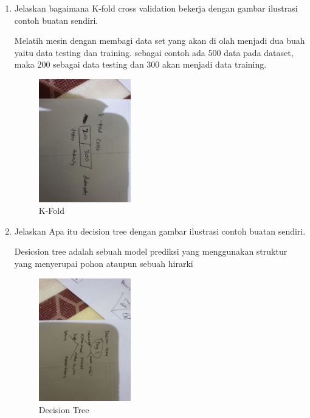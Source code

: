 \begin{enumerate}
            \item Jelaskan bagaimana K-fold cross validation bekerja dengan gambar ilustrasi contoh buatan sendiri.\par
            Melatih mesin dengan membagi data set yang akan di olah menjadi dua buah yaitu data testing dan training. sebagai contoh ada 500 data pada dataset, maka 200 sebagai data testing dan 300 akan menjadi data training.
            \begin{figure}[H]
                \includegraphics[width=4cm]{figures/1174040/chapter2/k.jpeg}
                \centering
                \caption{K-Fold}
            \end{figure}

            \item Jelaskan Apa itu decision tree dengan gambar ilustrasi contoh buatan sendiri.\par
            Desicsion tree adalah sebuah model prediksi yang menggunakan struktur yang menyerupai pohon ataupun sebuah hirarki
            \begin{figure}[H]
                \includegraphics[width=4cm]{figures/1174040/chapter2/tree.jpeg}
                \centering
                \caption{Decision Tree}
            \end{figure}


\end{enumerate}
